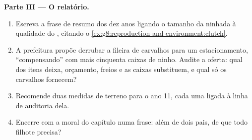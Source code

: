 \begin{problem}
\medskip\noindent\textbf{Parte III --- O relatório.}
\begin{enumerate}[resume]
  \item Escreva a frase de resumo dos dez anos ligando o tamanho da
        ninhada à qualidade do , citando o
        \cref{ex:g8:reproduction-and-environment:clutch}.
  \item A prefeitura propõe derrubar a fileira de carvalhos para um
        estacionamento, ``compensando'' com mais cinquenta caixas de
        ninho. Audite a oferta: qual dos itens deixa, orçamento,
        freios e  as caixas substituem, e qual só os carvalhos
        fornecem?
  \item Recomende duas medidas de terreno para o ano 11, cada uma
        ligada à linha de auditoria dela.
  \item Encerre com a moral do capítulo numa frase: além de dois
        pais, de que todo filhote precisa?
\end{enumerate}
\end{problem}
